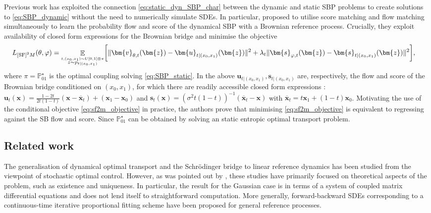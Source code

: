 \documentclass{article}
\newcommand{\E}{\mathbb{E}}
\theoremstyle{newstyle}
\begin{document}
Previous work \cite{tong2023simulation, pooladian2024plug} has exploited the connection \eqref{eq:static_dyn_SBP_char} between the dynamic and static SBP problems to create solutions to \eqref{eq:SBP_dynamic} without the need to numerically simulate SDEs. In particular, \cite{tong2023simulation} proposed to utilise score matching and flow matching simultaneously to learn the probability flow and score of the dynamical SBP with a Brownian reference process. Crucially, they exploit availability of closed form expressions for the Brownian bridge and minimise the objective
\begin{equation}
  \hspace{-1em} L_{\mathrm{[SF]}^2M}(\theta, \varphi) = \mathop{\E}_{\mathrel{\stackrel{t, (x_0, x_1) \sim U[0, 1] \otimes \pi}{z \sim p_{t | (x_0, x_1)}}}}  \biggl[ \| \bm{v}_{\theta, t}(\bm{z}) - \bm{u}_{t | (x_0, x_1)}(\bm{z}) \|^2 + \lambda_t \| \bm{s}_{\varphi, t}(\bm{z}) - \bm{s}_{t | (x_0, x_1)}(\bm{z}) \|^2 \biggr], \label{eq:sf2m_objective}
\end{equation}
where $\pi = \mathbb{P}_{01}^\star$ is the optimal coupling solving \eqref{eq:SBP_static}. In the above $\bm{u}_{t | (x_0, x_1)}, \bm{s}_{t|(x_0, x_1)}$ are, respectively, the flow and score of the Brownian bridge conditioned on $(x_0, x_1)$, for which there are readily accessible closed form expressions \cite[Eq. 8]{tong2023simulation}: $\bm{u}_t(\bm{x}) = \frac{1-2t}{2t(1-t)} (\bm{x} - \overline{\bm{x}}_t) + (\bm{x}_1 - \bm{x}_0)$ and $\bm{s}_t(\bm{x}) = (\sigma^2 t(1-t))^{-1} (\overline{\bm{x}}_t - \bm{x})$ with $\overline{\bm{x}}_t = t \bm{x}_1 + (1-t) \bm{x}_0$. 
Motivating the use of the conditional objective \eqref{eq:sf2m_objective} in practice, the authors prove \cite[Theorem 3.2]{tong2023simulation} that minimising \eqref{eq:sf2m_objective} is equivalent to regressing against the SB flow and score. Since $\mathbb{P}_{01}^\star$ can be obtained by solving an static entropic optimal transport problem.

\subsection{Related work}
The generalisation of dynamical optimal transport and the Schr\"odinger bridge to linear reference dynamics has been studied \cite{chen2016optimal, chen2015optimal, chen2015optimal2} from the viewpoint of stochastic optimal control. However, as was pointed out by \cite{bunne2023schrodinger}, these studies have primarily focused on theoretical aspects of the problem, such as existence and uniqueness. In particular, the result for the Gaussian case \cite{chen2015optimal} is in terms of a system of coupled matrix differential equations and does not lend itself to straightforward computation. More generally, forward-backward SDEs corresponding to a continuous-time iterative proportional fitting scheme \cite{vargas2021solving, shen2024multi} have been proposed for general reference processes. 
\end{document}
